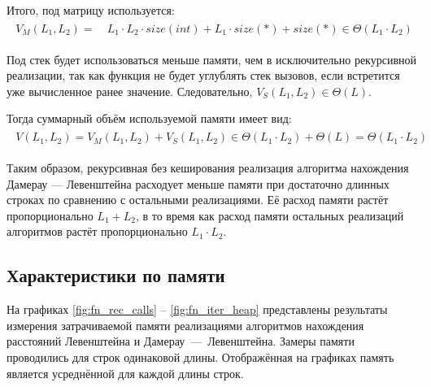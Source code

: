 Итого, под матрицу используется:
\begin{multline}
\begin{aligned}
V_M(L_1,L_2) =\ &L_1 \cdot L_2 \cdot size(int) + L_1 \cdot size(*) + size(*) \in \Theta(L_1 \cdot L_2)
\end{aligned}
\end{multline}

Под стек будет использоваться меньше памяти, чем в исключительно рекурсивной реализации, так как функция не будет углублять стек вызовов, если встретится уже вычисленное ранее значение.
Следовательно, $V_S(L_1,L_2) \in \Theta(L)$.

Тогда суммарный объём используемой памяти имеет вид:
\begin{multline}
\begin{aligned}
V(L_1,L_2) = V_M(L_1,L_2) + V_S(L_1,L_2) \in \Theta(L_1 \cdot L_2) + \Theta(L) = \Theta(L_1 \cdot L_2)
\end{aligned}
\end{multline}

Таким образом, рекурсивная без кеширования реализация алгоритма нахождения Дамерау --- Левенштейна расходует меньше памяти при достаточно длинных строках по сравнению с остальными реализациями.
Её расход памяти растёт пропорционально $L_1 + L_2$, в то время как расход памяти остальных реализаций алгоритмов растёт пропорционально $L_1 \cdot L_2$.

\subsection{Характеристики по памяти}

На графиках \ref{fig:fn_rec_calls} -- \ref{fig:fn_iter_heap} представлены результаты измерения затрачиваемой памяти реализациями алгоритмов нахождения расстояний Левенштейна и Дамерау~---~Левенштейна.
Замеры памяти проводились для строк одинаковой длины.
Отображённая на графиках память является усреднённой для каждой длины строк.

